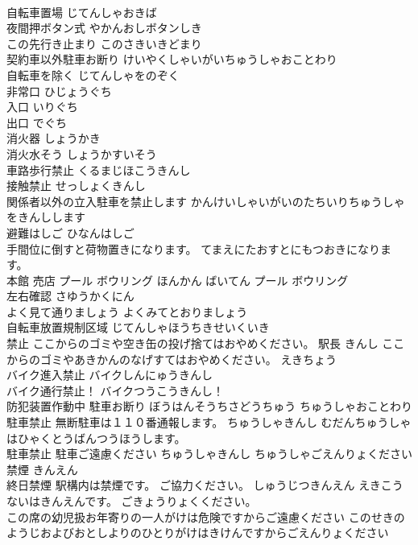 \documentclass[8pt]{extreport}
\begin{document}
\begin{CJK}{UTF8}{min}
\\	自転車置場	じてんしゃおきば	
\\	夜間押ボタン式	やかんおしボタンしき	
\\	この先行き止まり	このさきいきどまり	
\\	契約車以外駐車お断り	けいやくしゃいがいちゅうしゃおことわり	
\\	自転車を除く	じてんしゃをのぞく	
\\	非常口	ひじょうぐち	
\\	入口	いりぐち	
\\	出口	でぐち	
\\	消火器	しょうかき	
\\	消火水そう	しょうかすいそう	
\\	車路歩行禁止	くるまじほこうきんし	
\\	接触禁止	せっしょくきんし	
\\	関係者以外の立入駐車を禁止します	かんけいしゃいがいのたちいりちゅうしゃをきんしします	
\\	避難はしご	ひなんはしご	
\\	手間位に倒すと荷物置きになります。	てまえにたおすとにもつおきになります。	
\\	本館 売店 プール ボウリング	ほんかん ばいてん プール ボウリング	
\\	左右確認	さゆうかくにん	
\\	よく見て通りましょう	よくみてとおりましょう	
\\	自転車放置規制区域	じてんしゃほうちきせいくいき	
\\	禁止 ここからのゴミや空き缶の投げ捨てはおやめください。 駅長	きんし ここからのゴミやあきかんのなげすてはおやめください。 えきちょう	
\\	バイク進入禁止	バイクしんにゅうきんし	
\\	バイク通行禁止！	バイクつうこうきんし！	
\\	防犯装置作動中 駐車お断り	ぼうはんそうちさどうちゅう ちゅうしゃおことわり	
\\	駐車禁止 無断駐車は１１０番通報します。	ちゅうしゃきんし むだんちゅうしゃはひゃくとうばんつうほうします。	
\\	駐車禁止 駐車ご遠慮ください	ちゅうしゃきんし ちゅうしゃごえんりょください	
\\	禁煙	きんえん	
\\	終日禁煙 駅構内は禁煙です。 ご協力ください。	しゅうじつきんえん えきこうないはきんえんです。 ごきょうりょくください。	
\\	この席の幼児扱お年寄りの一人がけは危険ですからご遠慮ください	このせきのようじおよびおとしよりのひとりがけはきけんですからごえんりょください	

\end{CJK}
\end{document}
